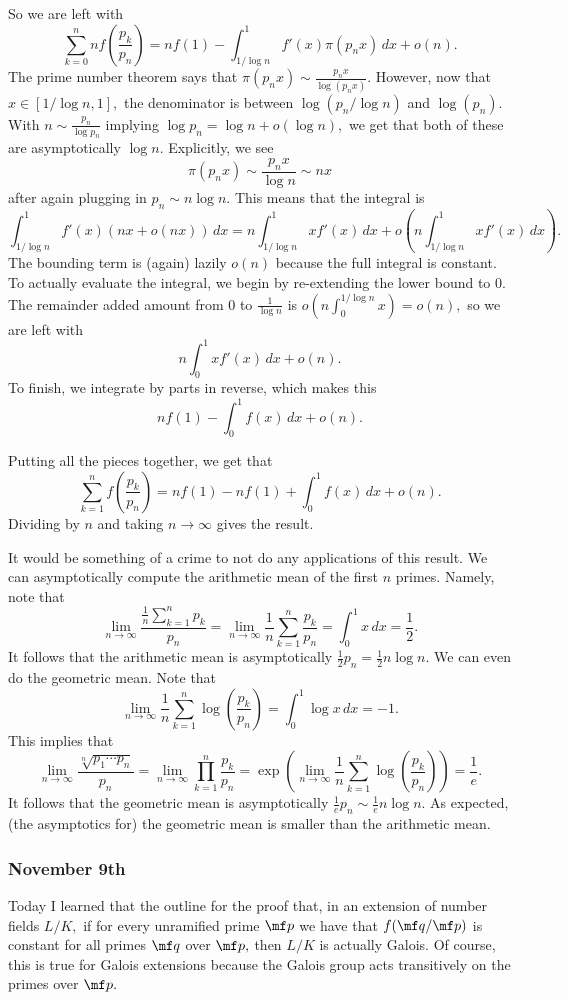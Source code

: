 So we are left with
\[\sum_{k=0}^nnf\left(\frac{p_k}{p_n}\right)=nf(1)-\int_{1/\log n}^1f'(x)\pi(p_nx)\,dx+o(n).\]
The prime number theorem says that $\pi(p_nx)\sim\frac{p_nx}{\log(p_nx)}.$ However, now that $x\in[1/\log n,1],$ the denominator is between $\log(p_n/\log n)$ and $\log(p_n).$ With $n\sim\frac{p_n}{\log p_n}$ implying $\log p_n=\log n+o(\log n),$ we get that both of these are asymptotically $\log n.$ Explicitly, we see
\[\pi(p_nx)\sim\frac{p_nx}{\log n}\sim nx\]
after again plugging in $p_n\sim n\log n.$ This means that the integral is
\[\int_{1/\log n}^1f'(x)(nx+o(nx))\,dx=n\int_{1/\log n}^1xf'(x)\,dx+o\left(n\int_{1/\log n}^1xf'(x)\,dx\right).\]
The bounding term is (again) lazily $o(n)$ because the full integral is constant. To actually evaluate the integral, we begin by re-extending the lower bound to $0.$ The remainder added amount from $0$ to $\frac1{\log n}$ is $o\left(n\int_0^{1/\log n}x\right)=o(n),$ so we are left with
\[n\int_0^1xf'(x)\,dx+o(n).\]
To finish, we integrate by parts in reverse, which makes this
\[nf(1)-\int_0^1f(x)\,dx+o(n).\]

Putting all the pieces together, we get that
\[\sum_{k=1}^nf\left(\frac{p_k}{p_n}\right)=nf(1)-nf(1)+\int_0^1f(x)\,dx+o(n).\]
Dividing by $n$ and taking $n\to\infty$ gives the result.

It would be something of a crime to not do any applications of this result. We can asymptotically compute the arithmetic mean of the first $n$ primes. Namely, note that
\[\lim_{n\to\infty}\frac{\displaystyle\frac1n\sum_{k=1}^np_k}{p_n}=\lim_{n\to\infty}\frac1n\sum_{k=1}^n\frac{p_k}{p_n}=\int_0^1x\,dx=\frac12.\]
It follows that the arithmetic mean is asymptotically $\frac12p_n=\frac12n\log n.$ We can even do the geometric mean. Note that
\[\lim_{n\to\infty}\frac1n\sum_{k=1}^n\log\left(\frac{p_k}{p_n}\right)=\int_0^1\log x\,dx=-1.\]
This implies that
\[\lim_{n\to\infty}\frac{\sqrt[n]{p_1\cdots p_n}}{p_n}=\lim_{n\to\infty}\prod_{k=1}^n\frac{p_k}{p_n}=\exp\left(\lim_{n\to\infty}\frac1n\sum_{k=1}^n\log\left(\frac{p_k}{p_n}\right)\right)=\frac1e.\]
It follows that the geometric mean is asymptotically $\frac1ep_n\sim\frac1en\log n.$ As expected, (the asymptotics for) the geometric mean is smaller than the arithmetic mean.

\subsubsection{November 9th}
Today I learned that the outline for the proof that, in an extension of number fields $L/K,$ if for every unramified prime $\mf p$ we have that $f(\mf q/\mf p)$ is constant for all primes $\mf q$ over $\mf p,$ then $L/K$ is actually Galois. Of course, this is true for Galois extensions because the Galois group acts transitively on the primes over $\mf p.$

